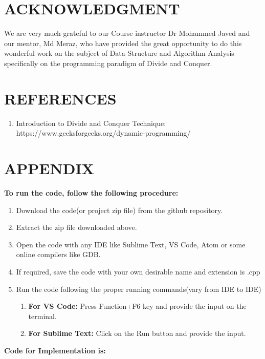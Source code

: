 \documentclass[10pt]{article}
\begin{document}
\begin{multicols*}{2}
\section*{ACKNOWLEDGMENT}

We are very much grateful to our Course instructor Dr Mohammed Javed and our mentor, Md Meraz, who have provided the great opportunity to do this wonderful work on the subject of Data Structure and Algorithm Analysis specifically on the programming paradigm of Divide and Conquer.

\section*{REFERENCES}

\begin{enumerate}
\item Introduction to Divide and Conquer Technique:\\
https://www.geeksforgeeks.org/dynamic-programming/
\end{enumerate}
\end{multicols*}

\newpage
\section*{APPENDIX}
\textbf{To run the code, follow the following procedure:}\\
\begin{enumerate}
    \item Download the code(or project zip file) from the github repository.
    \item Extract the zip file downloaded above.
    \item Open the code with any IDE like Sublime Text, VS Code, Atom or some online compilers like GDB.
    \item If required, save the code with your own desirable name and extension is .cpp
    \item Run the code following the proper running commands(vary from IDE to IDE)
    \begin{enumerate}
        \item \textbf{For VS Code:} Press Function+F6 key and provide the input on the terminal.
        \item \textbf{For Sublime Text:} Click on the Run button and provide the input.\\
    \end{enumerate}
\end{enumerate}
\textbf{Code for Implementation is:}
\end{document}
